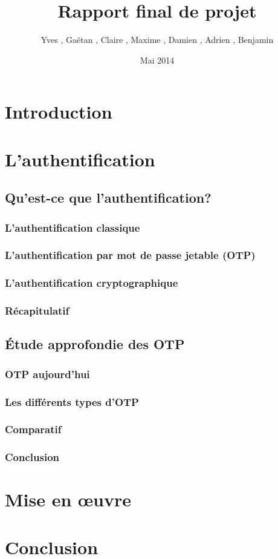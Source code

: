 \documentclass{"../../res/univ-projet-rapport"}
\title{Rapport final de projet}
\author{Yves \bsc{Adegoloye}, Gaëtan \bsc{Ferry}, Claire \bsc{Hardouin}, Maxime \bsc{Michotte}, Damien \bsc{Picard}, Adrien \bsc{Smondack}, Benjamin \bsc{Zigh}}
\date{Mai 2014}
\begin{document}
\maketitle
\tableofcontents
\newpage

\chapter{Introduction}



\chapter{L'authentification}

\section{Qu'est-ce que l'authentification?}

\subsection{L'authentification classique}

\subsection{L'authentification par mot de passe jetable (OTP)}

\subsection{L'authentification cryptographique}

\subsection{Récapitulatif}


\section{Étude approfondie des OTP}

\subsection{OTP aujourd'hui}

\subsection{Les différents types d'OTP}

\subsection{Comparatif}

\subsection{Conclusion}





\chapter{Mise en œuvre}



\chapter{Conclusion}
\end{document}

